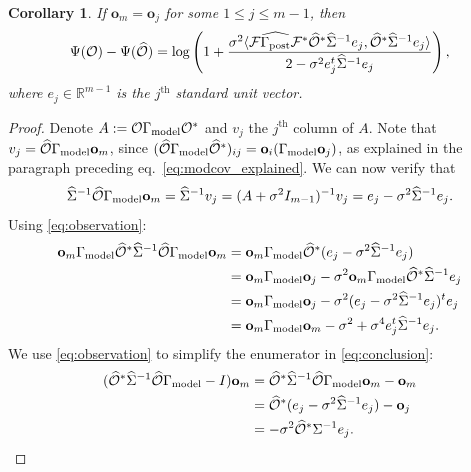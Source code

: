 \documentclass[ba]{imsart}
\newcommand{\obs}{\mathcal{O}}
\newcommand{\fwd}{\mathcal{F}}
\newcommand{\obsm}{\widehat{\obs}}
\newcommand{\Sigmam}{\widehat{\Sigma}}
\newcommand{\postcovm}{\widehat{\Gamma_{\textup{post}}}}
\newcommand{\tar}{\Psi}
\newcommand{\meas}{\mathbf{o}}
\theoremstyle{plain}
\newtheorem{corollary}[theorem]{Corollary}
\theoremstyle{definition}
\theoremstyle{remark}
\begin{document}
\begin{corollary}\label{cor:same_meas}
  If $\meas_m = \meas_j$ for some $1 \leq j \leq m-1$, then
  \begin{equation*}
    \tar(\obs) - \tar(\obsm) =
    \log \left ( 1 + \frac{\sigma^2
      \langle \fwd \postcovm \fwd^* \obsm^* \Sigmam^{-1} e_j,
      \obsm^* \Sigmam^{-1}e_j \rangle
    }{
      2 - \sigma^2 e_j^t\Sigmam^{-1}e_j 
    }       
    \right ),
  \end{equation*}
  where $e_j\in \mathbb{R}^{m-1}$ is the $j^{\text{th}}$ standard unit
  vector.
\end{corollary}

\begin{proof} \label{cor:same_meas_proof}
  Denote $A:= \obs \modcov \obs^*$ and $v_j$ the $j^{\text{th}}$
  column of $A$.  Note that $v_j = \obsm \modcov \meas_m$, since
  $(\obsm \modcov \obsm^*)_{ij} = \meas_i(\modcov \meas_j)$, as
  explained in the paragraph preceding
  eq.~\eqref{eq:modcov_explained}. We can now verify that
  \begin{equation}\label{eq:observation}
    \Sigmam^{-1} \obsm \modcov \meas_m = \Sigmam^{-1}v_j = (A +\sigma^2I_{m-1})^{-1} v_j =
    e_j -\sigma^2 \Sigmam^{-1}e_j.
  \end{equation}
Using \eqref{eq:observation}:
  \begin{align}\label{eq:denominator}
    \begin{split}
      \meas_m \modcov \obsm^* \Sigmam^{-1} \obsm \modcov \meas_m
      &= \meas_m \modcov \obsm^* ( e_j - \sigma^2 \Sigmam^{-1} e_j )\\
&= \meas_m \modcov \meas_j - \sigma^2 \meas_m \modcov \obsm^* \Sigmam^{-1}e_j \\
&= \meas_m \modcov \meas_j -\sigma^2 (e_j - \sigma^2 \Sigmam^{-1}e_j)^t e_j \\
&= \meas_m \modcov \meas_m -\sigma^2 + \sigma^4 e_j^t\Sigmam^{-1}e_j.
    \end{split}
  \end{align}
  We use \eqref{eq:observation} to simplify the enumerator in
  \eqref{eq:conclusion}:
  \begin{align}\label{eq:enumerator}
    \begin{split}
      (\obsm^* \Sigmam^{-1} \obsm \modcov - I ) \meas_m
      &= \obsm^* \Sigmam^{-1} \obsm \modcov \meas_m - \meas_m \\
&= \obsm^* (e_j - \sigma^2 \Sigmam^{-1} e_j) -\meas_j \\ 
&= -\sigma^2 \obsm^* \Sigma^{-1}e_j. 
    \end{split}

\end{align}
\end{proof}
\end{document}
